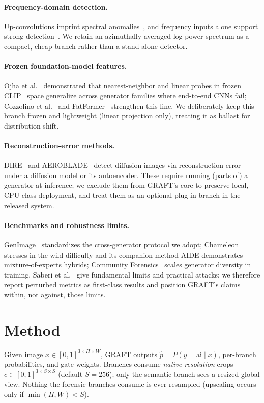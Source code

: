 \documentclass[10pt,twocolumn]{article}
\newcommand{\fake}{\mathrm{ai}}
\begin{document}
\paragraph{Frequency-domain detection.}
Up-convolutions imprint spectral anomalies~\cite{durall2020watch}, and
frequency inputs alone support strong detection~\cite{frank2020leveraging}.
We retain an azimuthally averaged log-power spectrum as a compact,
cheap branch rather than a stand-alone detector.

\paragraph{Frozen foundation-model features.}
Ojha et al.~\cite{ojha2023universal} demonstrated that nearest-neighbor and
linear probes in frozen CLIP~\cite{radford2021clip} space generalize across
generator families where end-to-end CNNs fail; Cozzolino et
al.~\cite{cozzolino2024raising} and FatFormer~\cite{liu2024fatformer}
strengthen this line. We deliberately keep this branch frozen and lightweight
(linear projection only), treating it as ballast for distribution shift.

\paragraph{Reconstruction-error methods.}
DIRE~\cite{wang2023dire} and AEROBLADE~\cite{ricker2024aeroblade} detect
diffusion images via reconstruction error under a diffusion model or its
autoencoder. These require running (parts of) a generator at inference; we
exclude them from GRAFT's core to preserve local, CPU-class deployment, and
treat them as an optional plug-in branch in the released system.

\paragraph{Benchmarks and robustness limits.}
GenImage~\cite{zhu2023genimage} standardizes the cross-generator protocol we
adopt; Chameleon~\cite{yan2025sanity} stresses in-the-wild difficulty and its
companion method AIDE demonstrates mixture-of-experts hybrids; Community
Forensics~\cite{park2025community} scales generator diversity in training.
Saberi et al.~\cite{saberi2024robustness} give fundamental limits and
practical attacks; we therefore report perturbed metrics as first-class
results and position GRAFT's claims within, not against, those limits.

\section{Method}
\label{sec:method}
Given image $x \in [0,1]^{3\times H\times W}$, GRAFT outputs
$\hat p = P(y{=}\fake \mid x)$, per-branch probabilities, and gate weights.
Branches consume \emph{native-resolution} crops $c \in
[0,1]^{3\times S\times S}$ (default $S{=}256$); only the semantic branch sees
a resized global view. Nothing the forensic branches consume is ever
resampled (upscaling occurs only if $\min(H,W)<S$).
\end{document}
